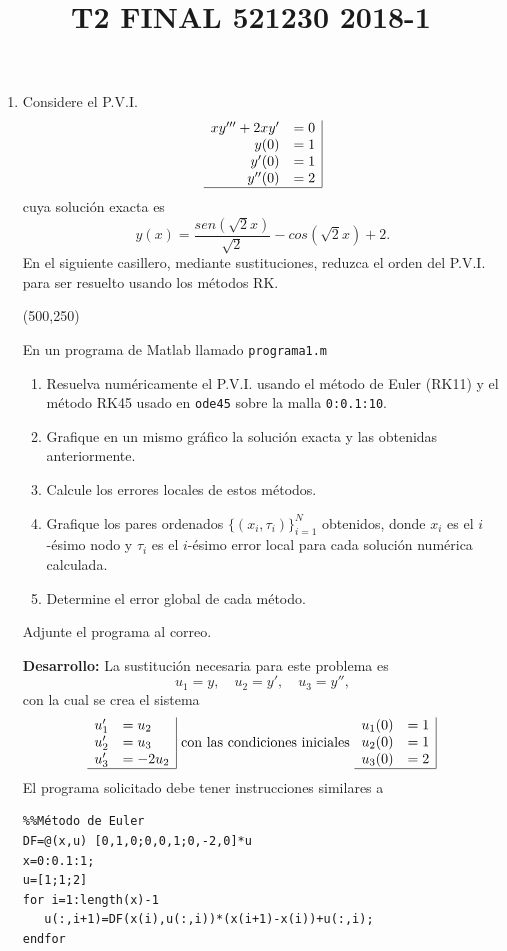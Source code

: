 \documentclass[legalpaper,11pt]{article}
\title{T2 FINAL 521230 2018-1}
\begin{document}
\begin{enumerate}
\item 
 Considere el P.V.I.
$$
\begin{array}{rl|}
xy'''+2xy'	&=0 \\
y(0)	&=1\\
y'(0)	&=1\\
y''(0)	&=2\\
\hline
\end{array}
$$
cuya soluci\'on exacta es 
$$
y(x) = \frac{sen(\sqrt{2} x)}{\sqrt{2}} - cos(\sqrt{2} x) + 2.
$$
En el siguiente casillero, mediante sustituciones, reduzca el orden del P.V.I. para ser resuelto usando los m\'etodos RK.

\hspace{-10mm}
\framebox(500,250){}

En un programa de Matlab llamado \texttt{programa1.m}
\begin{enumerate}
\item{}  Resuelva num\'ericamente el P.V.I. usando el m\'etodo de Euler (RK11) y el m\'etodo RK45 usado en \texttt{ode45} sobre la malla \texttt{0:0.1:10}.
\item {}  Grafique en un mismo gr\'afico la soluci\'on exacta y las obtenidas anteriormente.
\item{}  Calcule los errores locales de estos m\'etodos.
\item  {} Grafique los pares ordenados $\{(x_i,\tau_i)\}_{i=1}^N$ obtenidos, donde $x_i$ es el $i$-\'esimo nodo y $\tau_i$ es el $i$-\'esimo error local para cada soluci\'on num\'erica calculada.
\item {} Determine el error global de cada m\'etodo.
\end{enumerate}
Adjunte el programa al correo.

\textbf{Desarrollo:} La sustituci\'on necesaria para este problema es
$$
u_1=y, \quad u_2=y', \quad u_3=y'',
$$
con la cual se crea el sistema
$$
\begin{array}{cl|}
u_1'	&=u_2\\
u_2'	&=u_3\\
u_3'	&=-2 u_2\\ 
\hline
\end{array}
\text{ con las condiciones iniciales }
\begin{array}{cl|}
u_1(0)	&=1\\
u_2(0)	&=1\\
u_3(0)	&=2\\ 
\hline
\end{array}
$$
El programa solicitado debe tener instrucciones similares a
\begin{lstlisting}
%%Método de Euler
DF=@(x,u) [0,1,0;0,0,1;0,-2,0]*u
x=0:0.1:1;
u=[1;1;2]
for i=1:length(x)-1
   u(:,i+1)=DF(x(i),u(:,i))*(x(i+1)-x(i))+u(:,i);
endfor


\end{lstlisting}
\end{enumerate}
\end{document}
